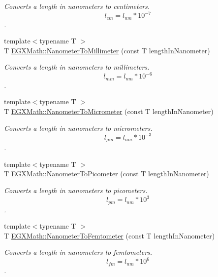 \begin{DoxyCompactItemize}
\begin{DoxyCompactList}\small\item\em Converts a length in nanometers to centimeters. \[ l_{cm}=l_{nm} * 10^{-7} \]. \end{DoxyCompactList}\item 
{\footnotesize template$<$typename T $>$ }\\T \mbox{\hyperlink{group___e_g_x_math-_conversions-_length_conversions-_nanometer-_s_i_gac8b870837f9a0213c8383079437e8cc6}{E\+G\+X\+Math\+::\+Nanometer\+To\+Millimeter}} (const T length\+In\+Nanometer)
\begin{DoxyCompactList}\small\item\em Converts a length in nanometers to millimeters. \[ l_{mm}=l_{nm} * 10^{-6} \]. \end{DoxyCompactList}\item 
{\footnotesize template$<$typename T $>$ }\\T \mbox{\hyperlink{group___e_g_x_math-_conversions-_length_conversions-_nanometer-_s_i_gaa539df5d709bface86429c8a25d7f6e1}{E\+G\+X\+Math\+::\+Nanometer\+To\+Micrometer}} (const T length\+In\+Nanometer)
\begin{DoxyCompactList}\small\item\em Converts a length in nanometers to micrometers. \[ l_{\mu m}=l_{nm} * 10^{-3} \]. \end{DoxyCompactList}\item 
{\footnotesize template$<$typename T $>$ }\\T \mbox{\hyperlink{group___e_g_x_math-_conversions-_length_conversions-_nanometer-_s_i_gaba1e9bf91f6e065f8ba8be8dd039b499}{E\+G\+X\+Math\+::\+Nanometer\+To\+Picometer}} (const T length\+In\+Nanometer)
\begin{DoxyCompactList}\small\item\em Converts a length in nanometers to picometers. \[ l_{pm}=l_{nm} * 10^{3} \]. \end{DoxyCompactList}\item 
{\footnotesize template$<$typename T $>$ }\\T \mbox{\hyperlink{group___e_g_x_math-_conversions-_length_conversions-_nanometer-_s_i_ga35ac002514f0d8cda8b1fe100b21f54b}{E\+G\+X\+Math\+::\+Nanometer\+To\+Femtometer}} (const T length\+In\+Nanometer)
\begin{DoxyCompactList}\small\item\em Converts a length in nanometers to femtometers. \[ l_{fm}=l_{nm} * 10^{6} \]. \end{DoxyCompactList}\item 

\end{DoxyCompactItemize}
